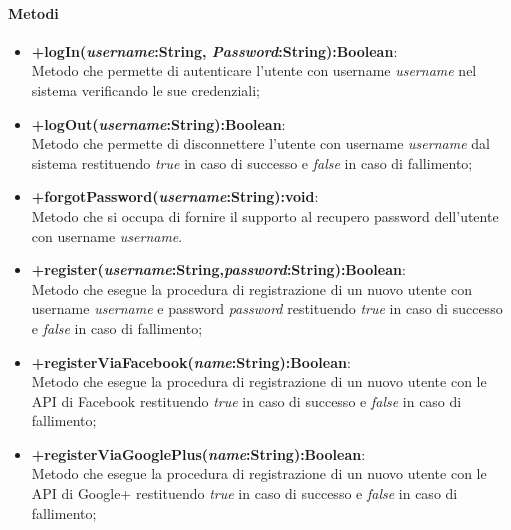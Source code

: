 	\paragraph{Metodi}
	\begin{itemize}
	  	\item \textbf{+logIn(\textit{username}:String, \textit{Password}:String):Boolean}:\\
		 	Metodo che permette di autenticare l'utente con username \textit{username} nel sistema verificando le sue credenziali;
	  	\item \textbf{+logOut(\textit{username}:String):Boolean}:\\
		  	Metodo che permette di disconnettere l'utente con username \textit{username} dal sistema restituendo \textit{true} in caso di successo e \textit{false} in caso di fallimento;
	  	\item \textbf{+forgotPassword(\textit{username}:String):void}:\\
		  	Metodo che si occupa di fornire il supporto al recupero password dell'utente con username \textit{username}.
	   	\item \textbf{+register(\textit{username}:String,\textit{password}:String):Boolean}:\\
	  		Metodo che esegue la procedura di registrazione di un nuovo utente con username \textit{username} e password \textit{password} restituendo \textit{true} in caso di successo e \textit{false} in caso di fallimento;
	  	\item \textbf{+registerViaFacebook(\textit{name}:String):Boolean}:\\
	  		 Metodo che esegue la procedura di registrazione di un nuovo utente con le API di Facebook restituendo \textit{true} in caso di successo e \textit{false} in caso di fallimento;
	  	\item \textbf{+registerViaGooglePlus(\textit{name}:String):Boolean}:\\
	  		 Metodo che esegue la procedura di registrazione di un nuovo utente con le API di Google+ restituendo \textit{true} in caso di successo e \textit{false} in caso di fallimento;
	\end{itemize}

